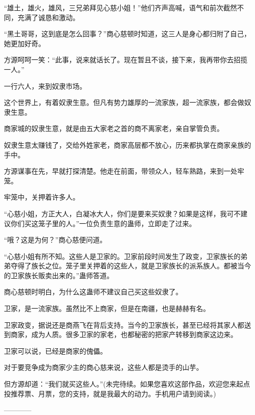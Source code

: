 \begin{this_body}
“雄土，雄火，雄风，三兄弟拜见心慈小姐！”他们齐声高喊，语气和前次截然不同，充满了诚恳和激动。

“黑土哥哥，这到底是怎么回事？”商心慈顿时知道，这三人是身心都归附了自己，她更加好奇。

方源呵呵一笑：“此事，说来就话长了。现在暂且不谈，接下来，我再带你去招揽一人。”

一行六人，来到奴隶市场。

这个世界上，有着奴隶生意。但凡有势力雄厚的一流家族，超一流家族，都会做奴隶生意。

商家城的奴隶生意，就是由五大家老之首的商不离家老，亲自掌管负责。

奴隶生意太赚钱了，交给外姓家老，商家高层都不放心，历来都执掌在商家亲族的手中。

方源谋事在先，早就打探清楚。他走在前面，带领众人，轻车熟路，来到一处牢笼。

牢笼中，关押着许多人。

“心慈小姐，方正大人，白凝冰大人，你们是要来买奴隶？如果是这样，我可不建议你们买这笼子里的人。”一位负责生意的蛊师，立即走了过来。

“哦？这是为何？”商心慈便问道。

“心慈小姐有所不知。这些人是卫家的。卫家前段时间发生了政变，卫家族长的弟弟夺得了族长之位。笼子里关押着的这些人，就是卫家族长的派系族人。都被当今的卫家族长贩卖出来的。”蛊师答道。

商心慈顿时明白，为什么这蛊师不建议自己买这些奴隶了。

卫家，是一流家族。虽然比不上商家，但是在南疆，也是赫赫有名。

卫家政变，据说还是商燕飞在背后支持。当今的卫家族长，甚至已经将其家人都送到商家，成为人质。很多卫家的家老，也都秘密的把家产转移到商家这边来。

卫家可以说，已经是商家的傀儡。

对于要竞争成为商家少主的商心慈来说，这些人都是烫手的山芋。

但方源却道：“我们就买这些人。”(未完待续。如果您喜欢这部作品，欢迎您来起点投推荐票、月票，您的支持，就是我最大的动力。手机用户请到阅读。)

------------

\end{this_body}

